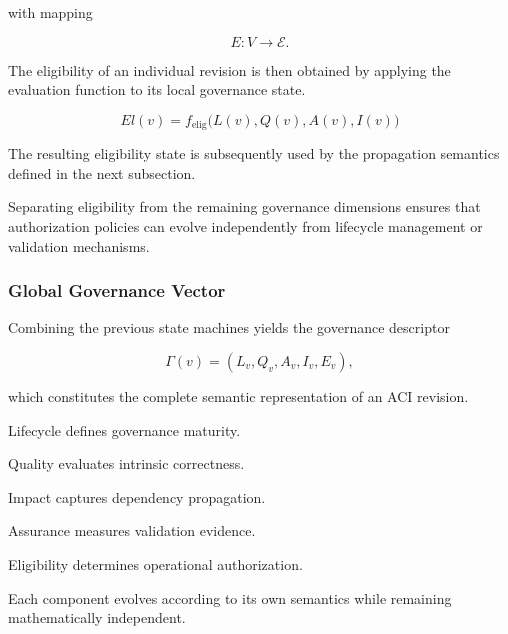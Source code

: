 \documentclass[10pt]{article}
\begin{document}
with mapping

\begin{equation}
E
:
V
\rightarrow
\mathcal{E}.
\label{eq:eligibility_state_mapping}
\end{equation}

The eligibility of an individual revision is then obtained by applying the
evaluation function to its local governance state.

\begin{equation}
	\label{eq:eligibility_definition}
	El(v)
	=
	f_{\mathrm{elig}}
	\bigl(
	L(v),
	Q(v),
	A(v),
	I(v)
	\bigr)
\end{equation}

The resulting eligibility state is subsequently used by the propagation semantics
defined in the next subsection.




Separating eligibility from the remaining governance dimensions ensures that
authorization policies can evolve independently from lifecycle management or
validation mechanisms.



\subsubsection{Global Governance Vector}

Combining the previous state machines yields the governance descriptor

\begin{equation}
\Gamma(v)
=
(
L_v,
Q_v,
A_v,
I_v,
E_v
),
\label{eq:governance_vector}
\end{equation}

which constitutes the complete semantic representation of an ACI revision.

Lifecycle defines governance maturity.

Quality evaluates intrinsic correctness.

Impact captures dependency propagation.

Assurance measures validation evidence.

Eligibility determines operational authorization.

Each component evolves according to its own semantics while remaining
mathematically independent.
\end{document}

